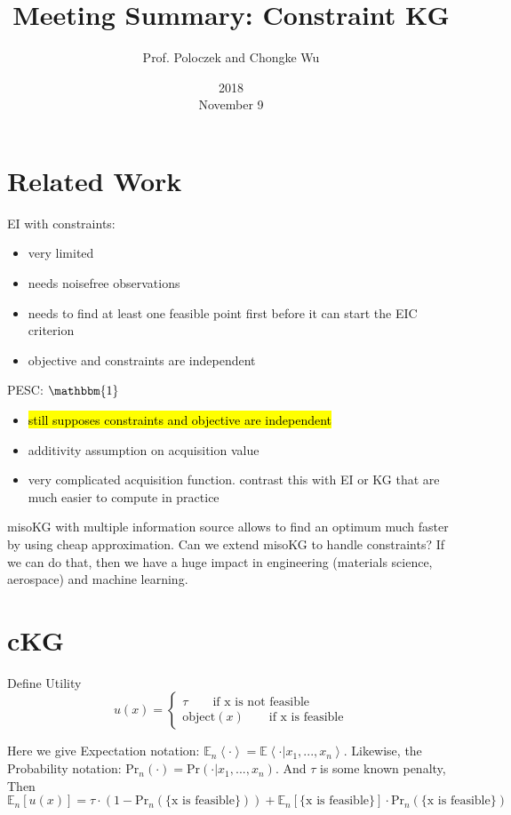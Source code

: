 \documentclass[12pt]{article}
\title{Meeting Summary: Constraint KG}
\date{2018\\ November 9}
\author{Prof. Poloczek and Chongke Wu}
\begin{document}
\maketitle
\section{Related Work}
EI with constraints:
\begin{itemize}
	\item very limited
	\item needs noisefree observations
	\item needs to find at least one feasible point first before it can start the EIC criterion
	\item objective and constraints are independent 
\end{itemize}

PESC: $\mathbbm{1}$
\begin{itemize}
	\item \hl{still supposes constraints and objective are independent} 
	\item additivity assumption on acquisition value
	\item very complicated acquisition function. contrast this with EI or KG that are much easier to compute in practice 
\end{itemize}

misoKG with multiple information source allows to find an optimum much faster by using cheap approximation. Can we extend misoKG to handle constraints? If we can do that, then we have a huge impact in engineering (materials science, aerospace) and machine learning.

\section{cKG}
Define Utility
\begin{equation*}
 u(x)=\left\{
\begin{aligned}
\tau \qquad \text{if x is not feasible} \\
\text{object}(x) \qquad \text{if x is feasible} 
\end{aligned}
\right.
\end{equation*}

Here we give Expectation notation: $\mathbb{E}_n\left\langle \cdot\right\rangle = \mathbb{E}\left\langle \cdot|x_1,...,x_n\right\rangle $.
Likewise, the Probability notation: $\text{Pr}_n(\cdot) = \text{Pr}(\cdot|x_1,...,x_n)$. And $\tau$ is some known penalty, Then
\begin{equation*}
\mathbb{E}_n[u(x)] = \tau\cdot(1 - \text{Pr}_n(\{\text{x is feasible}\})) +  \mathbb{E}_n[\{\text{x is feasible}\}]\cdot\text{Pr}_n(\{\text{x is feasible}\})
\end{equation*}
\end{document}
